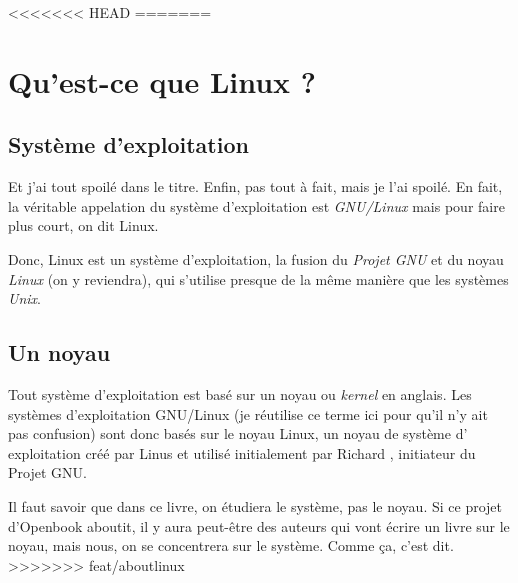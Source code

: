 <<<<<<< HEAD
=======
\chapter{Qu'est-ce que Linux ?}

\section{Système d'exploitation}

Et j'ai tout spoilé dans le titre. Enfin, pas tout à fait, mais je l'ai spoilé.
En fait, la véritable appelation du système d'exploitation est \emph{GNU/Linux}
mais pour faire plus court, on dit Linux.

Donc, Linux est un système d'exploitation, la fusion du \emph{Projet GNU} et du
noyau \emph{Linux} (on y reviendra), qui s'utilise presque de la même manière
que les systèmes \emph{Unix}.

\section{Un noyau}

Tout système d'exploitation est basé sur un noyau ou \emph{kernel} en anglais.
Les systèmes d'exploitation GNU/Linux (je réutilise ce terme ici pour qu'il n'y
ait pas confusion) sont donc basés sur le noyau Linux, un noyau de système d'
exploitation créé par Linus  et utilisé initialement par
Richard , initiateur du Projet GNU.

Il faut savoir que dans ce livre, on étudiera le système, pas le noyau. Si ce
projet d'Openbook aboutit, il y aura peut-être des auteurs qui vont écrire un
livre sur le noyau, mais nous, on se concentrera sur le système. Comme ça, c'est
dit.
>>>>>>> feat/aboutlinux
